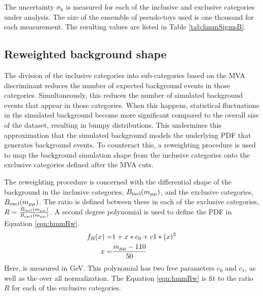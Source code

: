 The uncertainty $\sigma_\text{b}$ is measured for each of the inclusive and exclusive categories under analysis.
The size of the ensemble of pseudo-toys used is one thousand for each measurement.
The resulting values are listed in Table \ref{tab:hmmSigmsB}.


\subsection{Reweighted background shape}\label{sec:hmmRw}

The division of the inclusive categories into sub-categories based on the MVA discriminant reduces the number of expected background events in those categories.
Simultaneously, this reduces the number of simulated background events that appear in those categories.
When this happens, statistical fluctuations in the simulated background become more significant compared to the overall size of the dataset, resulting in bumpy \muu distributions.
This undermines this approximation that the simulated background models the underlying PDF that generates background events.
To counteract this, a reweighting procedure is used to map the background simulation shape from the inclusive categories onto the exclusive categories defined after the MVA cuts.

The reweighting procedure is concerned with the differential \muu shape of the background in the inclusive categories, $B_\text{incl}(m_{\mu\mu})$, and the exclusive categories, $B_\text{excl}(m_{\mu\mu})$.
The ratio is defined between these in each of the exclusive categories, $R=\frac{B_\text{incl}(m_{\mu\mu})}{B_\text{excl}(m_{\mu\mu})}$.
A second degree polynomial is used to define the PDF in Equation \ref{eqn:hmmRw}.
\begin{equation}\begin{split} \label{eqn:hmmRw}
f_R(x)=&1+x*c_0+c 1*(x)^2 \\
x=&\frac{m_{\mu\mu}-110}{50} \\
\end{split}\end{equation} 
Here, \muu is measured in GeV.
This polynomial has two free parameters $c_0$ and $c_1$, as well as the over all normalization.
The Equation \ref{eqn:hmmRw} is fit to the ratio $R$ for each of the exclusive categories.

